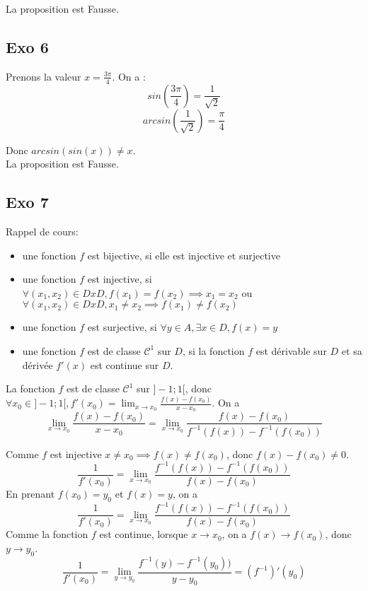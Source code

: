 \documentclass[]{book}
\theoremstyle{definition}
\begin{document}
La proposition est Fausse.

\subsection*{Exo 6}

Prenons la valeur $x=\frac{3\pi}{4}$. On a :
$$sin(\frac{3\pi}{4}) = \frac{1}{\sqrt{2}}$$
$$arcsin(\frac{1}{\sqrt{2}}) = \frac{\pi}{4}$$

Donc $arcsin(sin(x)) \neq x$.\\

La proposition est Fausse.

\subsection*{Exo 7}
Rappel de cours:\\
\begin{itemize}
\item une fonction $f$ est bijective, si elle est injective et surjective
\item une fonction $f$ est injective, si $\forall (x_1, x_2) \in D x D, f(x_1) = f(x_2) \implies x_1 = x_2$ ou $\forall (x_1, x_2) \in D x D, x_1 \neq x_2 \implies f(x_1) \neq f(x_2)$
\item une fonction $f$ est surjective, si $\forall y \in A, \exists x \in D, f(x) = y$ 
\item une fonction $f$ est de classe $\mathcal{C}^1$ sur $D$, si la fonction $f$ est d\'erivable sur $D$ et sa d\'eriv\'ee $f'(x)$ est continue sur $D$.
\end{itemize}

La fonction $f$ est de classe $\mathcal{C}^1$ sur $]-1;1[$, donc $\forall x_0 \in ]-1;1[, f'(x_0) = \lim_{x \to x_0}\frac{f(x) - f(x_0)}{x-x_0}$.
On a 
$$\lim_{x \to x_0}\frac{f(x) - f(x_0)}{x-x_0} = \lim_{x \to x_0}\frac{f(x) - f(x_0)}{f^{-1}(f(x)) - f^{-1}(f(x_0))}$$

Comme $f$ est injective $x \neq x_0 \implies f(x) \neq f(x_0)$, donc $f(x)-f(x_0) \neq 0$.\\
$$\frac{1}{f'(x_0)} = \lim_{x \to x_0}\frac{f^{-1}(f(x)) - f^{-1}(f(x_0))}{f(x) - f(x_0)}$$
En prenant $f(x_0) = y_0$ et $f(x) = y$, on a 
$$\frac{1}{f'(x_0)} = \lim_{x \to x_0}\frac{f^{-1}(f(x)) - f^{-1}(f(x_0))}{f(x) - f(x_0)}$$
Comme la fonction $f$ est continue, lorsque $x \to x_0$, on a $f(x) \to f(x_0)$, donc $y \to y_0$.
$$\frac{1}{f'(x_0)} = \lim_{y \to y_0}\frac{f^{-1}(y) - f^{-1}(y_0))}{y - y_0} = (f^{-1})'(y_0)$$
\end{document}

